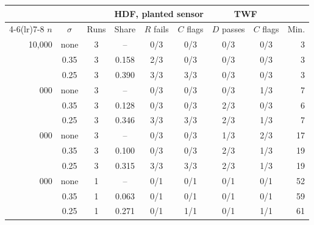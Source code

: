\begin{tabular}{@{}rcccccccr@{}}
\toprule
& & & \multicolumn{3}{c}{HDF, planted sensor} & \multicolumn{2}{c}{TWF} & \\
\cmidrule(lr){4-6}\cmidrule(lr){7-8}
$n$ & $\sigma$ & Runs & Share & $R$ fails & $C$ flags & $D$ passes & $C$ flags & Min. \\
\midrule
10{,}000 & none & 3 & -- & 0/3 & 0/3 & 0/3 & 0/3 & 3 \\
 & 0.35 & 3 & 0.158 & 2/3 & 0/3 & 0/3 & 0/3 & 3 \\
 & 0.25 & 3 & 0.390 & 3/3 & 3/3 & 0/3 & 0/3 & 3 \\
\addlinespace
30{,}000 & none & 3 & -- & 0/3 & 0/3 & 0/3 & 1/3 & 7 \\
 & 0.35 & 3 & 0.128 & 0/3 & 0/3 & 2/3 & 0/3 & 6 \\
 & 0.25 & 3 & 0.346 & 3/3 & 3/3 & 2/3 & 1/3 & 7 \\
\addlinespace
100{,}000 & none & 3 & -- & 0/3 & 0/3 & 1/3 & 2/3 & 17 \\
 & 0.35 & 3 & 0.100 & 0/3 & 0/3 & 2/3 & 1/3 & 19 \\
 & 0.25 & 3 & 0.315 & 3/3 & 3/3 & 2/3 & 1/3 & 19 \\
\addlinespace
300{,}000 & none & 1 & -- & 0/1 & 0/1 & 0/1 & 0/1 & 52 \\
 & 0.35 & 1 & 0.063 & 0/1 & 0/1 & 0/1 & 0/1 & 59 \\
 & 0.25 & 1 & 0.271 & 0/1 & 1/1 & 0/1 & 1/1 & 61 \\
\bottomrule
\end{tabular}

